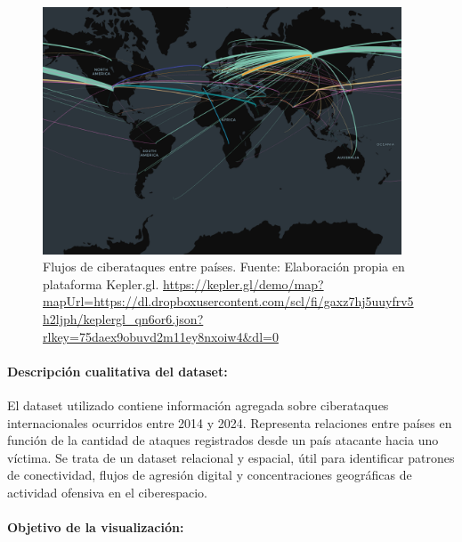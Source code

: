 \documentclass[12pt, a4paper]{article}
\begin{document}
\begin{figure}[H]
    \centering
    \includegraphics[width=0.95\textwidth]{images/Arc_Layer.png}
    \caption{Flujos de ciberataques entre países. Fuente: Elaboración propia en plataforma Kepler.gl. \url{https://kepler.gl/demo/map?mapUrl=https://dl.dropboxusercontent.com/scl/fi/gaxz7hj5uuyfrv5h2ljph/keplergl_qn6or6.json?rlkey=75daex9obuvd2m11ey8nxoiw4&dl=0}}
\end{figure}

\paragraph{Descripción cualitativa del dataset:}

El dataset utilizado contiene información agregada sobre ciberataques internacionales ocurridos entre 2014 y 2024. Representa relaciones entre países en función de la cantidad de ataques registrados desde un país atacante hacia uno víctima.
Se trata de un dataset relacional y espacial, útil para identificar patrones de conectividad, flujos de agresión digital y concentraciones geográficas de actividad ofensiva en el ciberespacio.

\paragraph{Objetivo de la visualización:}
\end{document}
